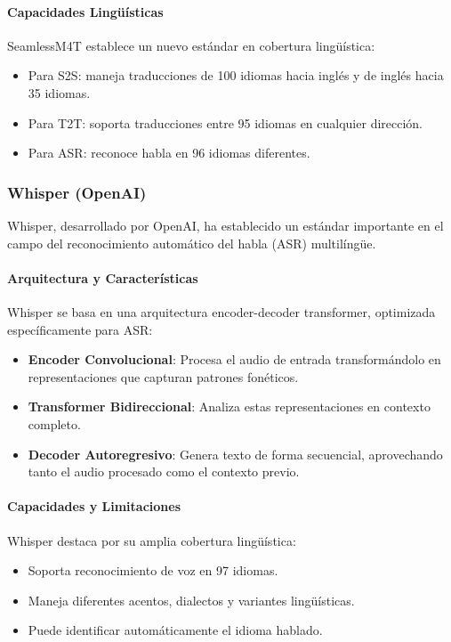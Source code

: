 \paragraph{Capacidades Lingüísticas}
SeamlessM4T establece un nuevo estándar en cobertura lingüística:

\begin{itemize}
    \item Para S2S: maneja traducciones de 100 idiomas hacia inglés y de inglés hacia 35 idiomas.
    \item Para T2T: soporta traducciones entre 95 idiomas en cualquier dirección.
    \item Para ASR: reconoce habla en 96 idiomas diferentes.
\end{itemize}

\subsubsection{Whisper (OpenAI)}
Whisper, desarrollado por OpenAI, ha establecido un estándar importante en el campo del reconocimiento automático del habla (ASR) multilíngüe.

\paragraph{Arquitectura y Características}
Whisper se basa en una arquitectura encoder-decoder transformer, optimizada específicamente para ASR:

\begin{itemize}
    \item \textbf{Encoder Convolucional}: Procesa el audio de entrada transformándolo en representaciones que capturan patrones fonéticos.
    
    \item \textbf{Transformer Bidireccional}: Analiza estas representaciones en contexto completo.
    
    \item \textbf{Decoder Autoregresivo}: Genera texto de forma secuencial, aprovechando tanto el audio procesado como el contexto previo.
\end{itemize}

\paragraph{Capacidades y Limitaciones}
Whisper destaca por su amplia cobertura lingüística:

\begin{itemize}
    \item Soporta reconocimiento de voz en 97 idiomas.
    \item Maneja diferentes acentos, dialectos y variantes lingüísticas.
    \item Puede identificar automáticamente el idioma hablado.
\end{itemize}

